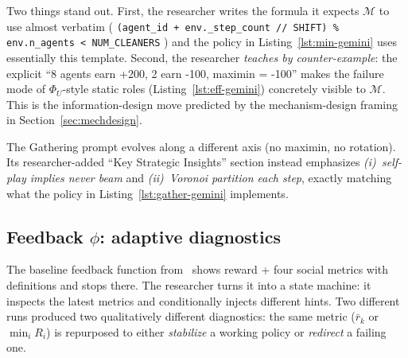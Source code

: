 \documentclass{article}
\newcommand{\cM}{\mathcal{M}}
\begin{document}
Two things stand out. First, the researcher writes the formula it expects $\cM$ to use almost verbatim ( \texttt{(agent\_id + env.\_step\_count // SHIFT) \% env.n\_agents < NUM\_CLEANERS} ) and the policy in Listing~\ref{lst:min-gemini} uses essentially this template. Second, the researcher \emph{teaches by counter-example}: the explicit ``8 agents earn +200, 2 earn -100, maximin = -100'' makes the failure mode of $\Phi_U$-style static roles (Listing~\ref{lst:eff-gemini}) concretely visible to $\cM$. This is the information-design move predicted by the mechanism-design framing in Section~\ref{sec:mechdesign}.

The Gathering prompt evolves along a different axis (no maximin, no rotation). Its researcher-added ``Key Strategic Insights'' section instead emphasizes \emph{(i)~self-play implies never beam} and \emph{(ii)~Voronoi partition each step}, exactly matching what the policy in Listing~\ref{lst:gather-gemini} implements.


\subsection{Feedback $\phi$: adaptive diagnostics}
\label{app:art-feedback}

The baseline feedback function from~\cite{gallego2026} shows reward + four social metrics with definitions and stops there. The researcher turns it into a state machine: it inspects the latest metrics and conditionally injects different hints. Two different runs produced two qualitatively different diagnostics: the same metric ($\bar r_k$ or $\min_i R_i$) is repurposed to either \emph{stabilize} a working policy or \emph{redirect} a failing one.
\end{document}
